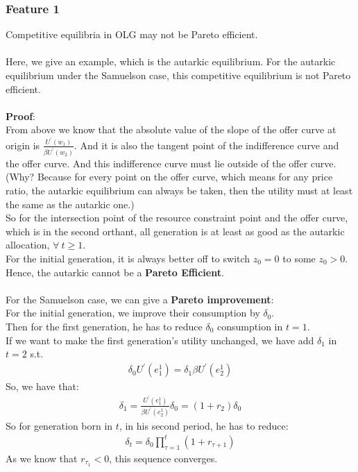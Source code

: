 \documentclass{article}
\begin{document}
\subsubsection{Feature 1}
Competitive equilibria in OLG may not be Pareto efficient.\\\\
Here, we give an example, which is the autarkic equilibrium. For the autarkic equilibrium under the Samuelson case, this competitive equilibrium is not Pareto efficient.\\\\
\textbf{Proof}:\\
\indent From above we know that the absolute value of the slope of the offer curve at origin is $\frac{U^\prime(w_1)}{\beta U^\prime(w_2)}$. And it is also the tangent point of the indifference curve and the offer curve. And this indifference curve must lie outside of the offer curve. (Why? Because for every point on the offer curve, which means for any price ratio, the autarkic equilibrium can always be taken, then the utility must at least the same as the autarkic one.)\\
\indent So for the intersection point of the resource constraint point and the offer curve, which is in the second orthant, all generation is at least as good as the autarkic allocation, $\forall\ t \geq 1$.\\
\indent For the initial generation, it is always better off to switch $z_0 = 0$ to some $z_0 > 0$.\\
\indent Hence, the autarkic cannot be a \textbf{Pareto Efficient}.\\\\
For the Samuelson case, we can give a \textbf{Pareto improvement}:\\
\indent For the initial generation, we improve their consumption by $\delta_0$.\\
\indent Then for the first generation, he has to reduce $\delta_0$ consumption in $t = 1$.\\
\indent If we want to make the first generation's utility unchanged, we have add $\delta_1$ in $t = 2$ s.t.
	\begin{align*}
		\delta_0 U^\prime(e^1_1) = \delta_1 \beta U^\prime(e^1_2)
	\end{align*}
\indent So, we have that:
	\begin{align*}
		\delta_1 = \frac{U^\prime(e^1_1)}{\beta U^\prime(e^1_2)} \delta_0 = (1 + r_2)\delta_0
	\end{align*}
\indent So for generation born in $t$, in his second period, he has to reduce:
	\begin{align*}
		\delta_t = \delta_0 \prod\limits^t_{\tau=1}(1 + r_{\tau+1})
	\end{align*}
\indent As we know that $r_{\tau_1} < 0$, this sequence converges.
\end{document}
